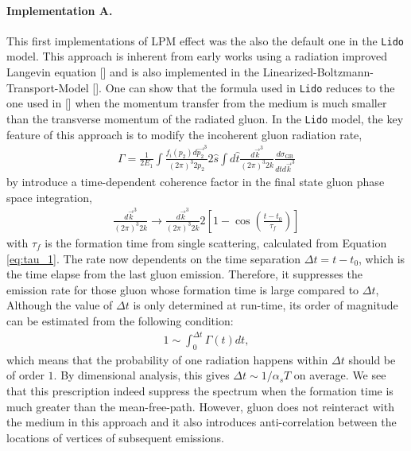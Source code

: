 \documentclass[aps, prc, reprint, amsmath, groupedaddress, nofootinbib]{revtex4-1}
\begin{document}
\paragraph*{Implementation A.} This first implementations of LPM effect was the also the default one in the {\tt Lido} model. 
This approach is inherent from early works using a radiation improved Langevin equation [] and is also implemented in the Linearized-Boltzmann-Transport-Model []. 
One can show that the formula used in {\tt Lido} reduces to the one used in [] when the momentum transfer from the medium is much smaller than the transverse momentum of the radiated gluon.
In the {\tt Lido} model, the key feature of this approach is to modify the incoherent gluon radiation rate,
\begin{eqnarray}\label{eq:GB-rate}
\Gamma = \frac{1}{2E_1}\int\frac{f_i(p_2)d\vec{p_2}^3}{(2\pi)^3 2p_2}2\hat{s}\int d\hat{t}\frac{d\vec{k}^3}{(2\pi)^3 2k}\frac{d\sigma_{\textrm{GB}}}{d\hat{t}d\vec{k}^3}
\end{eqnarray}
by introduce a time-dependent coherence factor in the final state gluon phase space integration,
\begin{eqnarray}
\frac{d\vec{k}^3}{(2\pi)^3 2k} \rightarrow \frac{d\vec{k}^3}{(2\pi)^3 2k} 2\left[1-\cos\left(\frac{t-t_0}{\tau_f}\right)\right]
\end{eqnarray}
with $\tau_f$ is the formation time from single scattering, calculated from Equation \ref{eq:tau_1}. 
The rate now dependents on the time separation $\Delta t = t-t_0$, which is the time elapse from the last gluon emission.
Therefore, it suppresses the emission rate for those gluon whose formation time is large compared to $\Delta t$, 
Although the value of $\Delta t$ is only determined at run-time,
its order of magnitude can be estimated from the following condition:
\begin{eqnarray}
1 \sim \int_0^{\Delta t}\Gamma(t) dt,
\end{eqnarray}
which means that the probability of one radiation happens within $\Delta t$ should be of order $1$.
By dimensional analysis, this gives $\Delta t \sim 1/\alpha_s T$ on average.
We see that this prescription indeed suppress the spectrum when the formation time is much greater than the mean-free-path.
However, gluon does not reinteract with the medium in this approach and it also introduces anti-correlation between the locations of vertices of subsequent emissions.
\end{document}
